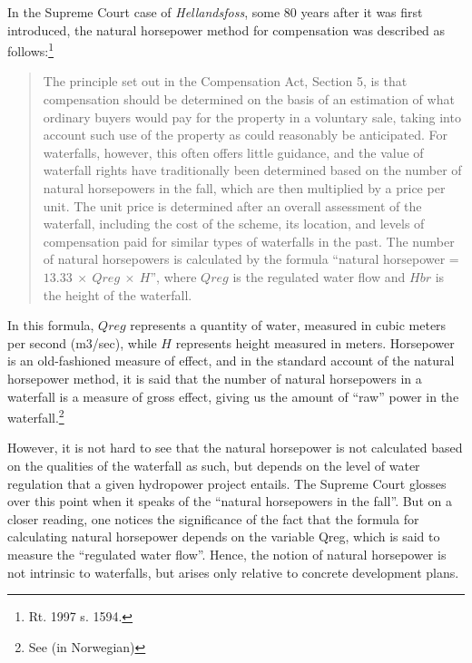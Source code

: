 In the Supreme Court case of \emph{Hellandsfoss}, some 80 years after it was first introduced, the natural horsepower method for compensation was described as follows:\footnote{Rt. 1997 s. 1594.} 
\begin{quote}
The principle set out in the Compensation Act, Section 5, is that compensation should be determined on the basis of an estimation of what ordinary buyers would pay for the property in a voluntary sale, taking into account such use of the property as could reasonably be anticipated. For waterfalls, however, this often offers little guidance, and the value of waterfall rights have traditionally been determined based on the number of natural horsepowers in the fall, which are then multiplied by a price per unit. The unit price is determined after an overall assessment of the waterfall, including the cost of the scheme, its location, and levels of compensation paid for similar types of waterfalls in the past. The number of natural horsepowers is calculated by the formula ``natural horsepower = $13.33 \ \times \ Qreg \ \times \ H$'', where $Qreg$ is the regulated water flow and $Hbr$ is the height of the waterfall.
\end{quote}

In this formula, $Qreg$ represents a quantity of water, measured in cubic meters per second (m3/sec), while $H$ represents height  measured in meters. Horsepower is an old-fashioned measure of effect, and in the standard account of the natural horsepower method, it is said that the number of natural horsepowers in a waterfall is a measure of gross effect, giving us the amount of ``raw'' power in the waterfall.\footnote{See \cite{Falk}(in Norwegian)}

However, it is not hard to see that the natural horsepower is not calculated based on the qualities of the waterfall as such, but depends on the level of water regulation that a given hydropower project entails. The Supreme Court glosses over this point when it speaks of the ``natural horsepowers in the fall''. But on a closer reading, one notices the significance of the fact that the formula for calculating natural horsepower depends on the variable Qreg, which is said to measure the ``regulated water flow''. Hence, the notion of natural horsepower is not intrinsic to waterfalls, but arises only relative to concrete development plans.

